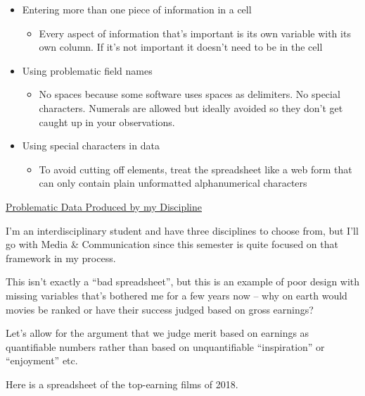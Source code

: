 \documentclass[12pt]{article}
\begin{document}
\begin{itemize}
\begin{itemize}
    \end{itemize}
    \item Entering more than one piece of information in a cell
    \begin{itemize}
        \item Every aspect of information that’s important is its own variable with its own column. If it’s not important it doesn’t need to be in the cell
    \end{itemize}
    \item Using problematic field names
    \begin{itemize}
        \item No spaces because some software uses spaces as delimiters. No special characters. Numerals are allowed but ideally avoided so they don’t get caught up in your observations. 
    \end{itemize}
    \item Using special characters in data
    \begin{itemize}
        \item To avoid cutting off elements, treat the spreadsheet like a web form that can only contain plain unformatted alphanumerical characters
    \end{itemize}
\end{itemize}


\underline{Problematic Data Produced by my Discipline}

\vspace{1em}
I’m an interdisciplinary student and have three disciplines to choose from, but I’ll go with Media \& Communication since this semester is quite focused on that framework in my process.

This isn’t exactly a “bad spreadsheet”, but this is an example of poor design with missing variables that’s bothered me for a few years now – why on earth would movies be ranked or have their success judged based on gross earnings? 

Let’s allow for the argument that we judge merit based on earnings as quantifiable numbers rather than based on unquantifiable “inspiration” or “enjoyment” etc.
 
Here is a spreadsheet of the top-earning films of 2018. 
\end{document}
